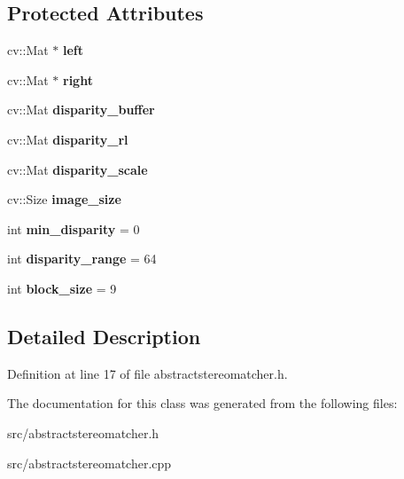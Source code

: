 \subsection*{Protected Attributes}
\begin{DoxyCompactItemize}
\item 
\hypertarget{class_abstract_stereo_matcher_ab588c178d38aefc2bd8fdbb267d58fa3}{}cv\+::\+Mat $\ast$ {\bfseries left}\label{class_abstract_stereo_matcher_ab588c178d38aefc2bd8fdbb267d58fa3}

\item 
\hypertarget{class_abstract_stereo_matcher_a57d8d83507e36de82d29091c662cd7a1}{}cv\+::\+Mat $\ast$ {\bfseries right}\label{class_abstract_stereo_matcher_a57d8d83507e36de82d29091c662cd7a1}

\item 
\hypertarget{class_abstract_stereo_matcher_a8cdb8335cd34ea188acb52af1c61767f}{}cv\+::\+Mat {\bfseries disparity\+\_\+buffer}\label{class_abstract_stereo_matcher_a8cdb8335cd34ea188acb52af1c61767f}

\item 
\hypertarget{class_abstract_stereo_matcher_a51c30315cdc2c2eb0442abfccd99c2a3}{}cv\+::\+Mat {\bfseries disparity\+\_\+rl}\label{class_abstract_stereo_matcher_a51c30315cdc2c2eb0442abfccd99c2a3}

\item 
\hypertarget{class_abstract_stereo_matcher_a9465d0369a736080bdd9466a8eb99e01}{}cv\+::\+Mat {\bfseries disparity\+\_\+scale}\label{class_abstract_stereo_matcher_a9465d0369a736080bdd9466a8eb99e01}

\item 
\hypertarget{class_abstract_stereo_matcher_a923b35821693ae332ca597d1aa39eda6}{}cv\+::\+Size {\bfseries image\+\_\+size}\label{class_abstract_stereo_matcher_a923b35821693ae332ca597d1aa39eda6}

\item 
\hypertarget{class_abstract_stereo_matcher_a34abfc8eae69117a1095aaea88ae757f}{}int {\bfseries min\+\_\+disparity} = 0\label{class_abstract_stereo_matcher_a34abfc8eae69117a1095aaea88ae757f}

\item 
\hypertarget{class_abstract_stereo_matcher_af950cd28dd5ace7e5dda654f85878990}{}int {\bfseries disparity\+\_\+range} = 64\label{class_abstract_stereo_matcher_af950cd28dd5ace7e5dda654f85878990}

\item 
\hypertarget{class_abstract_stereo_matcher_a120960da2f7cb8f7549f359c6ff7e86d}{}int {\bfseries block\+\_\+size} = 9\label{class_abstract_stereo_matcher_a120960da2f7cb8f7549f359c6ff7e86d}

\end{DoxyCompactItemize}


\subsection{Detailed Description}


Definition at line 17 of file abstractstereomatcher.\+h.



The documentation for this class was generated from the following files\+:\begin{DoxyCompactItemize}
\item 
src/abstractstereomatcher.\+h\item 
src/abstractstereomatcher.\+cpp\end{DoxyCompactItemize}
